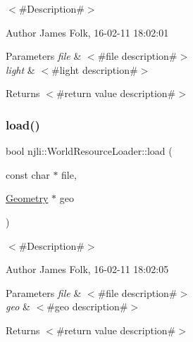 $<$\#\+Description\#$>$ 

\begin{DoxyAuthor}{Author}
James Folk, 16-\/02-\/11 18\+:02\+:01
\end{DoxyAuthor}

\begin{DoxyParams}{Parameters}
{\em file} & $<$\#file description\#$>$ \\
\hline
{\em light} & $<$\#light description\#$>$\\
\hline
\end{DoxyParams}
\begin{DoxyReturn}{Returns}
$<$\#return value description\#$>$ 
\end{DoxyReturn}
\mbox{\label{classnjli_1_1_world_resource_loader_a9a65176315945a2201c160ca0df35edd}} 
\subsubsection{\texorpdfstring{load()}{load()}\hspace{0.1cm}{\footnotesize\ttfamily [6/13]}}
{\footnotesize\ttfamily bool njli\+::\+World\+Resource\+Loader\+::load (\begin{DoxyParamCaption}\item[{const char $\ast$}]{file,  }\item[{\mbox{\hyperlink{classnjli_1_1_geometry}{Geometry}} $\ast$}]{geo }\end{DoxyParamCaption})}



$<$\#\+Description\#$>$ 

\begin{DoxyAuthor}{Author}
James Folk, 16-\/02-\/11 18\+:02\+:05
\end{DoxyAuthor}

\begin{DoxyParams}{Parameters}
{\em file} & $<$\#file description\#$>$ \\
\hline
{\em geo} & $<$\#geo description\#$>$\\
\hline
\end{DoxyParams}
\begin{DoxyReturn}{Returns}
$<$\#return value description\#$>$ 
\end{DoxyReturn}
\mbox{\label{classnjli_1_1_world_resource_loader_aace00d44c99e64510a75ac65a19178aa}} 

